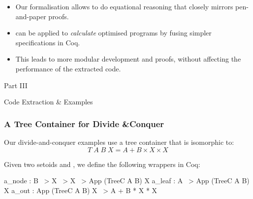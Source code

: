 \begin{frame}[fragile]
  \begin{center}
    \begin{itemize}
    \item Our formalisation allows to do equational reasoning that closely
mirrors pen-and-paper proofs.
    \item {} can be applied to \emph{calculate} optimised
programs by fusing simpler specifications in Coq.
    \item This leads to more modular development and proofs, without affecting
the performance of the extracted code.
    \end{itemize}
  \end{center}
\end{frame}

\begin{frame}
  \vfill
  \centering
  \begin{sticky}
    {\normalfont Part III}

    {\normalfont\Large Code Extraction \& Examples}
    \par%
  \end{sticky}
  \vfill
\end{frame}

\begin{frame}[fragile]
  \frametitle{A Tree Container for Divide \&Conquer}

  Our divide-and-conquer examples use a tree container  that is
isomorphic to:
  \[
    T\; A\; B\; X = A + B \times X \times X
  \]
  \vspace{.3cm}

  Given two setoids  and , we define the following wrappers in
Coq:
\vspace{.4cm}

\begin{center}
\begin{minipage}{.65\textwidth}
\begin{bluebox}
  \begin{coqcode}
a_node : B ~> X ~> X ~> App (TreeC A B) X
a_leaf : A ~> App (TreeC A B) X
a_out : App (TreeC A B) X ~> A + B * X * X
  \end{coqcode}
\end{bluebox}
\end{minipage}
\end{center}
\end{frame}

